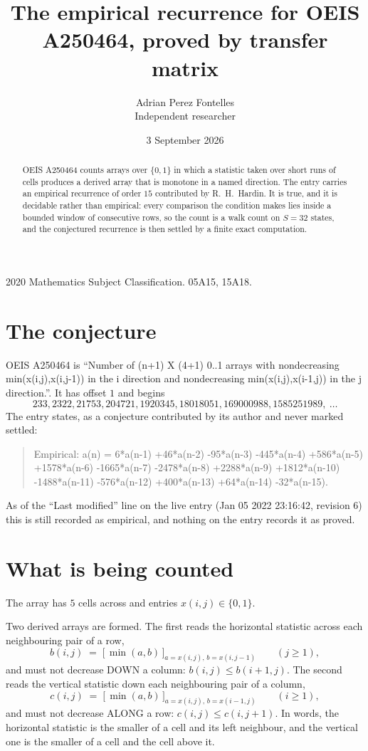 \documentclass[11pt,a4paper]{article}
\title{The empirical recurrence for OEIS A250464, proved by transfer matrix}
\author{Adrian Perez Fontelles\\ \small Independent researcher}
\date{3 September 2026}
\theoremstyle{plain}
\theoremstyle{definition}
\begin{document}
\maketitle

\begin{abstract}
OEIS A250464 counts arrays over $\{0,1\}$ in which a statistic taken over short runs
of cells produces a derived array that is monotone in a named direction. The entry carries an
empirical recurrence of order $15$ contributed by R.~H.~Hardin. It is true, and it is
decidable rather than empirical: every comparison the condition makes lies inside a bounded
window of consecutive rows, so the count is a walk count on $S=32$ states, and the
conjectured recurrence is then settled by a finite exact computation.
\end{abstract}

\noindent\small 2020 Mathematics Subject Classification. 05A15, 15A18.\normalsize

\section{The conjecture}

OEIS A250464 is ``Number of (n+1) X (4+1) 0..1 arrays with nondecreasing min(x(i,j),x(i,j-1)) in the i direction and nondecreasing min(x(i,j),x(i-1,j)) in the j direction.''. It has offset $1$ and begins
\[
233, 2322, 21753, 204721, 1920345, 18018051, 169000988, 1585251989,\ \dots
\]
The entry states, as a conjecture contributed by its author and never marked settled:
\begin{quote}
Empirical: a(n) = 6*a(n-1) +46*a(n-2) -95*a(n-3) -445*a(n-4) +586*a(n-5) +1578*a(n-6) -1665*a(n-7) -2478*a(n-8) +2288*a(n-9) +1812*a(n-10) -1488*a(n-11) -576*a(n-12) +400*a(n-13) +64*a(n-14) -32*a(n-15).
\end{quote}
As of the ``Last modified'' line on the live entry (Jan 05 2022 23:16:42, revision 6) this is still
recorded as empirical, and nothing on the entry records it as proved.

\section{What is being counted}

The array has $5$ cells across and entries $x(i,j)\in\{0,1\}$.

Two derived arrays are formed. The first reads the horizontal statistic across each
neighbouring pair of a row,
\[
b(i,j)\;=\;\bigl[\,\min(a,b)\,\bigr]_{a=x(i,j),\,b=x(i,j-1)}\qquad (j\ge1),
\]
and must not decrease DOWN a column: $b(i,j)\le b(i{+}1,j)$. The second reads the vertical
statistic down each neighbouring pair of a column,
\[
c(i,j)\;=\;\bigl[\,\min(a,b)\,\bigr]_{a=x(i,j),\,b=x(i{-}1,j)}\qquad (i\ge1),
\]
and must not decrease ALONG a row: $c(i,j)\le c(i,j{+}1)$. In words, the horizontal statistic
is the smaller of a cell and its left neighbour, and the vertical one is
the smaller of a cell and the cell above it.
\end{document}
